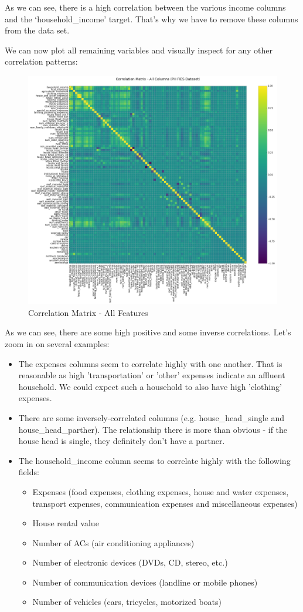 \documentclass{article}
\begin{document}
As we can see, there is a high correlation between the various income columns and the ‘household\_income’ target. That’s why we have to remove these columns from the data set.

We can now plot all remaining variables and visually inspect for any other correlation patterns:

\begin{figure}[H]
\caption{Correlation Matrix - All Features}
\centering
\includegraphics[width = 0.7 \textwidth]{all_features_corr_1}
\end{figure}

As we can see, there are some high positive and some inverse correlations. Let's zoom in on several examples:

\begin{itemize}
  \item The expenses columns seem to correlate highly with one another. That is reasonable as high 'transportation' or 'other' expenses indicate an affluent household. We could expect such a household to also have high 'clothing' expenses.
  \item There are some inversely-correlated columns (e.g. house\_head\_single and house\_head\_parther). The relationship there is more than obvious - if the house head is single, they definitely don't have a partner.
  \item The household\_income column seems to correlate highly with the following fields:
  \begin{itemize}
    \item Expenses (food expenses, clothing expenses, house and water expenses, transport expenses, communication expenses and miscellaneous expenses)
    \item House rental value
    \item Number of ACs (air conditioning appliances)
    \item Number of electronic devices (DVDs, CD, stereo, etc.)
    \item Number of communication devices (landline or mobile phones)
    \item Number of vehicles (cars, tricycles, motorized boats)
  \end{itemize}
\end{itemize}
\end{document}
